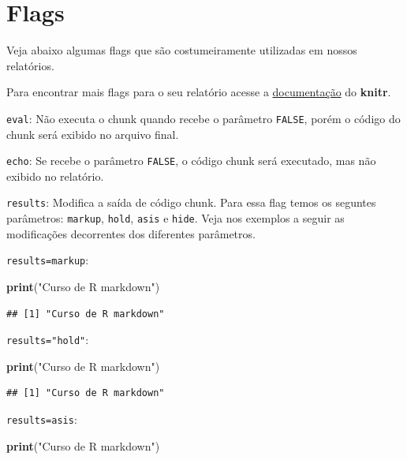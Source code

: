 \documentclass[
]{book}
\newenvironment{Shaded}{\begin{snugshade}}{\end{snugshade}}
\newcommand{\KeywordTok}[1]{\textcolor[rgb]{0.13,0.29,0.53}{\textbf{#1}}}
\newcommand{\NormalTok}[1]{#1}
\newcommand{\StringTok}[1]{\textcolor[rgb]{0.31,0.60,0.02}{#1}}
\begin{document}
\hypertarget{flags}{%
\section{Flags}\label{flags}}

Veja abaixo algumas flags que são costumeiramente utilizadas em nossos relatórios.

Para encontrar mais flags para o seu relatório acesse a \href{https://yihui.name/knitr/options}{documentação} do \textbf{knitr}.

\texttt{eval}: Não executa o chunk quando recebe o parâmetro \texttt{FALSE}, porém o código do chunk será exibido no arquivo final.

\texttt{echo}: Se recebe o parâmetro \texttt{FALSE}, o código chunk será executado, mas não exibido no relatório.

\texttt{results}: Modifica a saída de código chunk. Para essa flag temos os seguntes parâmetros: \texttt{markup}, \texttt{hold}, \texttt{asis} e \texttt{hide}. Veja nos exemplos a seguir as modificações decorrentes dos diferentes parâmetros.

\texttt{results=\textquotesingle{}markup\textquotesingle{}}:

\begin{Shaded}
\begin{Highlighting}[]
\KeywordTok{print}\NormalTok{(}\StringTok{"Curso de R markdown"}\NormalTok{)}
\end{Highlighting}
\end{Shaded}

\begin{verbatim}
## [1] "Curso de R markdown"
\end{verbatim}

\texttt{results="hold"}:

\begin{Shaded}
\begin{Highlighting}[]
\KeywordTok{print}\NormalTok{(}\StringTok{"Curso de R markdown"}\NormalTok{)}
\end{Highlighting}
\end{Shaded}

\begin{verbatim}
## [1] "Curso de R markdown"
\end{verbatim}

\texttt{results=\textquotesingle{}asis\textquotesingle{}}:

\begin{Shaded}
\begin{Highlighting}[]
\KeywordTok{print}\NormalTok{(}\StringTok{"Curso de R markdown"}\NormalTok{)}
\end{Highlighting}
\end{Shaded}
\end{document}
